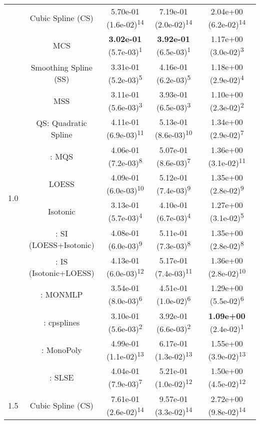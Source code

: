 \begin{tabular}{ccccc}
\multirow{14}{*}{1.0}&Cubic Spline (CS)& 5.70e-01 (1.6e-02)\textsuperscript{14}& 7.19e-01 (2.0e-02)\textsuperscript{14}& 2.04e+00 (6.2e-02)\textsuperscript{14}\tabularnewline
&MCS& \textbf{3.02e-01} (5.7e-03)\textsuperscript{1}& \textbf{3.92e-01} (6.5e-03)\textsuperscript{1}& 1.17e+00 (3.0e-02)\textsuperscript{3}\tabularnewline
&Smoothing Spline (SS)& 3.31e-01 (5.2e-03)\textsuperscript{5}& 4.16e-01 (6.2e-03)\textsuperscript{5}& 1.18e+00 (2.9e-02)\textsuperscript{4}\tabularnewline
&MSS& 3.11e-01 (5.6e-03)\textsuperscript{3}& 3.93e-01 (6.5e-03)\textsuperscript{3}& 1.10e+00 (2.3e-02)\textsuperscript{2}\tabularnewline
&QS: Quadratic Spline& 4.11e-01 (6.9e-03)\textsuperscript{11}& 5.13e-01 (8.6e-03)\textsuperscript{10}& 1.34e+00 (2.9e-02)\textsuperscript{7}\tabularnewline
&\textcite{heMonotoneBsplineSmoothing1998}: MQS& 4.06e-01 (7.2e-03)\textsuperscript{8}& 5.07e-01 (8.6e-03)\textsuperscript{7}& 1.36e+00 (3.1e-02)\textsuperscript{11}\tabularnewline
&LOESS& 4.09e-01 (6.0e-03)\textsuperscript{10}& 5.12e-01 (7.4e-03)\textsuperscript{9}& 1.35e+00 (2.8e-02)\textsuperscript{9}\tabularnewline
&Isotonic& 3.13e-01 (5.7e-03)\textsuperscript{4}& 4.10e-01 (6.7e-03)\textsuperscript{4}& 1.27e+00 (3.1e-02)\textsuperscript{5}\tabularnewline
&\textcite{mammenEstimatingSmoothMonotone1991}: SI (LOESS+Isotonic)& 4.08e-01 (6.0e-03)\textsuperscript{9}& 5.11e-01 (7.3e-03)\textsuperscript{8}& 1.35e+00 (2.8e-02)\textsuperscript{8}\tabularnewline
&\textcite{mammenEstimatingSmoothMonotone1991}: IS (Isotonic+LOESS)& 4.13e-01 (6.0e-03)\textsuperscript{12}& 5.17e-01 (7.4e-03)\textsuperscript{11}& 1.36e+00 (2.8e-02)\textsuperscript{10}\tabularnewline
&\textcite{cannonMonmlpMultilayerPerceptron2017}: MONMLP& 3.54e-01 (8.0e-03)\textsuperscript{6}& 4.51e-01 (1.0e-02)\textsuperscript{6}& 1.29e+00 (5.5e-02)\textsuperscript{6}\tabularnewline
&\textcite{navarro-garciaConstrainedSmoothingOutofrange2023}: cpsplines& 3.10e-01 (5.6e-03)\textsuperscript{2}& 3.92e-01 (6.6e-03)\textsuperscript{2}& \textbf{1.09e+00} (2.4e-02)\textsuperscript{1}\tabularnewline
&\textcite{murrayFastFlexibleMethods2016a}: MonoPoly& 4.99e-01 (1.1e-02)\textsuperscript{13}& 6.17e-01 (1.3e-02)\textsuperscript{13}& 1.55e+00 (3.9e-02)\textsuperscript{13}\tabularnewline
&\textcite{groeneboomConfidenceIntervalsMonotone2023}: SLSE& 4.04e-01 (7.9e-03)\textsuperscript{7}& 5.21e-01 (1.0e-02)\textsuperscript{12}& 1.50e+00 (4.5e-02)\textsuperscript{12}\tabularnewline
\midrule
\multirow{14}{*}{1.5}&Cubic Spline (CS)& 7.61e-01 (2.6e-02)\textsuperscript{14}& 9.57e-01 (3.3e-02)\textsuperscript{14}& 2.72e+00 (9.8e-02)\textsuperscript{14}\tabularnewline

\end{tabular}
